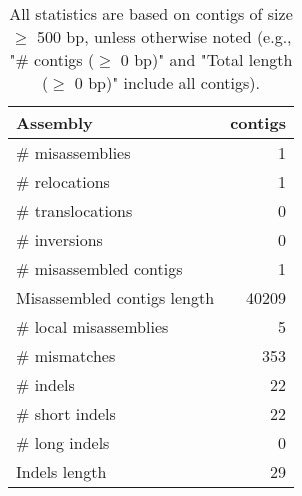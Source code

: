 \documentclass[12pt,a4paper]{article}
\begin{document}
\begin{table}[ht]
\begin{center}
\caption{All statistics are based on contigs of size $\geq$ 500 bp, unless otherwise noted (e.g., "\# contigs ($\geq$ 0 bp)" and "Total length ($\geq$ 0 bp)" include all contigs).}
\begin{tabular}{|l*{1}{|r}|}
\hline
Assembly & contigs \\ \hline
\# misassemblies & 1 \\ \hline
\hspace{5mm}\# relocations & 1 \\ \hline
\hspace{5mm}\# translocations & 0 \\ \hline
\hspace{5mm}\# inversions & 0 \\ \hline
\# misassembled contigs & 1 \\ \hline
Misassembled contigs length & 40209 \\ \hline
\# local misassemblies & 5 \\ \hline
\# mismatches & 353 \\ \hline
\# indels & 22 \\ \hline
\hspace{5mm}\# short indels & 22 \\ \hline
\hspace{5mm}\# long indels & 0 \\ \hline
Indels length & 29 \\ \hline
\end{tabular}
\end{center}
\end{table}
\end{document}
